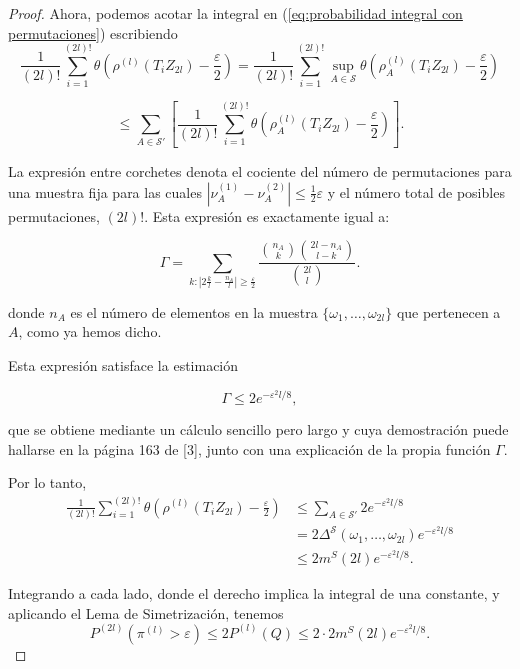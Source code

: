 \documentclass{report}
\begin{document}
\begin{proof}
Ahora, podemos acotar la integral en (\ref{eq:probabilidad integral con permutaciones}) escribiendo
\[
\frac{1}{(2l)!} \sum_{i=1}^{(2l)!} \theta \left(  \rho^{(l)}(T_i Z_{2l}) - \frac{\varepsilon}{2}  \right) 
= \frac{1}{(2l)!} \sum_{i=1}^{(2l)!} \sup_{A \in \mathcal{S}} \theta \left(  \rho^{(l)}_A(T_i Z_{2l}) - \frac{\varepsilon}{2}  \right)
\]

\[
\leq \sum_{A \in \mathcal{S}'} \left[ \frac{1}{(2l)!} \sum_{i=1}^{(2l)!} \theta \left(  \rho^{(l)}_A(T_i Z_{2l}) - \frac{\varepsilon}{2}  \right) \right].
\]

La expresión entre corchetes denota el cociente del número de permutaciones para una muestra fija 
para las cuales \( |\nu^{(1)}_A - \nu^{(2)}_A| \leq \frac{1}{2} \varepsilon \) y el número total de posibles permutaciones, $(2l)!$. Esta expresión
es exactamente igual a:

\[
\Gamma = \sum_{k : |2\frac{k}{l} - \frac{n_A}{l}| \geq \frac{\varepsilon}{2}} \frac{\binom{n_A}{k} \binom{2l - n_A}{l - k}}{\binom{2l}{l}}.
\]

donde \( n_A \) es el número de elementos en la muestra \( \{\omega_1, \dots, \omega_{2l}\} \) que pertenecen a \( A \), como ya hemos dicho. \newline 

Esta expresión satisface la estimación 

\[
\Gamma \leq 2 e^{-\varepsilon^2 l / 8},
\]

que se obtiene mediante un cálculo sencillo pero largo y cuya demostración puede hallarse en la página 163 de [3], junto con una explicación de la propia función $\Gamma$.  \newline

Por lo tanto,
\begin{equation}\label{promedio de tita acotado por la funcion de crecimiento}
\begin{aligned}
\frac{1}{(2l)!} \sum_{i=1}^{(2l)!} \theta \left(  \rho^{(l)}(T_i Z_{2l}) - \frac{\varepsilon}{2} \right) 
&\leq \sum_{A \in \mathcal{S}'} 2 e^{-\varepsilon^2 l / 8} \\
&= 2 \Delta^{\mathcal{S}}(\omega_1, \dots, \omega_{2l}) e^{-\varepsilon^2 l / 8}\\
&\leq 2 m^S(2l) e^{-\varepsilon^2 l / 8}.
\end{aligned}
\end{equation}

Integrando a cada lado, donde el derecho implica la integral de una constante, y aplicando el Lema de Simetrización, tenemos
\[
P^{(2l)}\left(\pi^{(l)}>\varepsilon\right) \leq 2 P^{(l)}(Q) \leq 2 \cdot 2 m^S(2l) e^{-\varepsilon^2 l / 8}.
\]

\end{proof}
\end{document}
